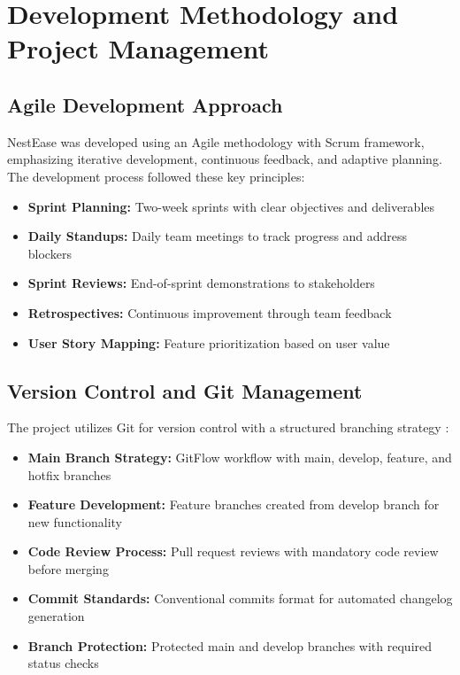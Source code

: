 \documentclass[conference]{IEEEtran}
\begin{document}


\section{Development Methodology and Project Management}
\subsection{Agile Development Approach}
NestEase was developed using an Agile methodology with Scrum framework, emphasizing iterative development, continuous feedback, and adaptive planning. The development process followed these key principles:

\begin{itemize}
    \item \textbf{Sprint Planning:} Two-week sprints with clear objectives and deliverables
    \item \textbf{Daily Standups:} Daily team meetings to track progress and address blockers
    \item \textbf{Sprint Reviews:} End-of-sprint demonstrations to stakeholders
    \item \textbf{Retrospectives:} Continuous improvement through team feedback
    \item \textbf{User Story Mapping:} Feature prioritization based on user value
\end{itemize}

\subsection{Version Control and Git Management}
The project utilizes Git for version control with a structured branching strategy \cite{devops_practices}:

\begin{itemize}
    \item \textbf{Main Branch Strategy:} GitFlow workflow with main, develop, feature, and hotfix branches
    \item \textbf{Feature Development:} Feature branches created from develop branch for new functionality
    \item \textbf{Code Review Process:} Pull request reviews with mandatory code review before merging
    \item \textbf{Commit Standards:} Conventional commits format for automated changelog generation
    \item \textbf{Branch Protection:} Protected main and develop branches with required status checks
\end{itemize}
\end{document}
